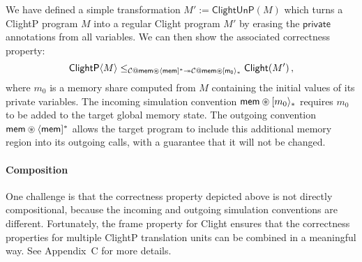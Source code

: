 \documentclass[acmsmall,screen,review,anonymous,nonacm]{acmart}
\newcommand{\kw}[1]{\ensuremath{ \mathsf{#1} }}
\newcommand{\sepconj}{\oast}
\begin{document}
We have defined a simple transformation $M' := \kw{ClightUnP}(M)$
which turns a ClightP program $M$ into a regular Clight program $M'$
by erasing the $\kw{private}$ annotations from all variables.
We can then show the associated correctness property:
\[
  \kw{ClightP}\langle M \rangle \le_{
    \mathcal{C} \mathbin@ \kw{mem} \sepconj \langle \kw{mem} ]^*
    \twoheadrightarrow
    \mathcal{C} \mathbin@ \kw{mem} \sepconj [ \kw{m_0} \rangle_*}
  \kw{Clight}(M')
  \,,
\]
where $m_0$ is a memory share computed from $M$
containing the initial values of its private variables.
The incoming simulation convention $\kw{mem} \sepconj [m_0\rangle_*$
requires $m_0$ to be added to the target global memory state.
The outgoing convention $\kw{mem} \sepconj \langle \kw{mem} ]^*$
allows the target program to include this additional memory region
into its outgoing calls,
with a guarantee that it will not be changed.



\paragraph{Composition}

One challenge is that the correctness property depicted above
is not directly compositional,
because the incoming and outgoing simulation conventions are different.
Fortunately,
the frame property for Clight ensures that
the correctness properties for multiple ClightP translation units
can be combined in a meaningful way.
See Appendix~C for more details. %

\end{document}
